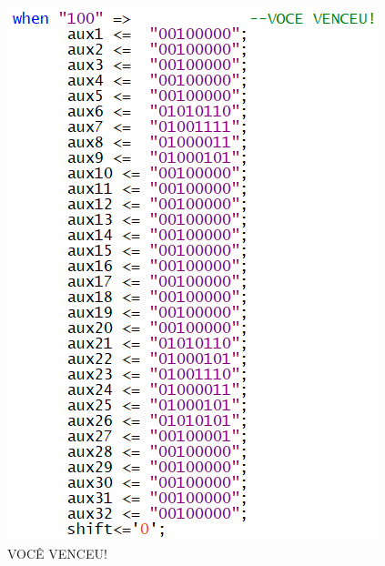 \documentclass[14pt, oneside]{book}
\theoremstyle{definition}
\begin{document}
                \begin{figure}[H]
                    \centering
                    \includegraphics[scale=1]{lcdexample5.png}
                    \caption{VOCÊ VENCEU!}
                    \label{lcdexample5}
                \end{figure}
                
\end{document}
